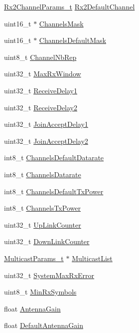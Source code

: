 \begin{DoxyCompactItemize}
\item 
\mbox{\hyperlink{group___l_o_r_a_m_a_c_ga8f57f29481ea92c24f6af04b96a95e0f}{Rx2\+Channel\+Params\+\_\+t}} \mbox{\hyperlink{unionu_mib_param_a0fc23f09c886e3ce57ed0bd2061b336a}{Rx2\+Default\+Channel}}
\item 
uint16\+\_\+t $\ast$ \mbox{\hyperlink{unionu_mib_param_aed7477cfc6166e3ee0499b898443426a}{Channels\+Mask}}
\item 
uint16\+\_\+t $\ast$ \mbox{\hyperlink{unionu_mib_param_ac22764d7ec77150f51f49a3c8839f161}{Channels\+Default\+Mask}}
\item 
uint8\+\_\+t \mbox{\hyperlink{unionu_mib_param_ab2d109f5c6312dc56dfc9842bb6f141b}{Channel\+Nb\+Rep}}
\item 
uint32\+\_\+t \mbox{\hyperlink{unionu_mib_param_ace391217d534408b8f2af268a4ef0945}{Max\+Rx\+Window}}
\item 
uint32\+\_\+t \mbox{\hyperlink{unionu_mib_param_a426f0e1108ebe3ba1b05c2853c0b0c3a}{Receive\+Delay1}}
\item 
uint32\+\_\+t \mbox{\hyperlink{unionu_mib_param_a67fbe3fba2eb31f8879ea22674dd50d8}{Receive\+Delay2}}
\item 
uint32\+\_\+t \mbox{\hyperlink{unionu_mib_param_a59ed32d2c7ce6d0b2011da8b0109b391}{Join\+Accept\+Delay1}}
\item 
uint32\+\_\+t \mbox{\hyperlink{unionu_mib_param_ae4a12f9dc83c6cedcf8afc05fb9ea06f}{Join\+Accept\+Delay2}}
\item 
int8\+\_\+t \mbox{\hyperlink{unionu_mib_param_a69f274bb7ff03f12dbda701c3576ac62}{Channels\+Default\+Datarate}}
\item 
int8\+\_\+t \mbox{\hyperlink{unionu_mib_param_a6c741587260d08d1b883922ce9ca345e}{Channels\+Datarate}}
\item 
int8\+\_\+t \mbox{\hyperlink{unionu_mib_param_af926e909a910970adb9eccc849020c71}{Channels\+Default\+Tx\+Power}}
\item 
int8\+\_\+t \mbox{\hyperlink{unionu_mib_param_ad015aefb498e98276b4102f847b05d0e}{Channels\+Tx\+Power}}
\item 
uint32\+\_\+t \mbox{\hyperlink{unionu_mib_param_ae8c54ca277e4d7295dfd498889e42fdd}{Up\+Link\+Counter}}
\item 
uint32\+\_\+t \mbox{\hyperlink{unionu_mib_param_a7a566925baf83b1b3da9209dfa4bb79a}{Down\+Link\+Counter}}
\item 
\mbox{\hyperlink{group___l_o_r_a_m_a_c_ga02d2523505cac70954c043074087ea65}{Multicast\+Params\+\_\+t}} $\ast$ \mbox{\hyperlink{unionu_mib_param_ab0f9cda74f301d191aa5f7d7090c1557}{Multicast\+List}}
\item 
uint32\+\_\+t \mbox{\hyperlink{unionu_mib_param_a62adc341212fe903e9995966051c5fee}{System\+Max\+Rx\+Error}}
\item 
uint8\+\_\+t \mbox{\hyperlink{unionu_mib_param_ab33f97482f9af163d593cf103a2ccf1c}{Min\+Rx\+Symbols}}
\item 
float \mbox{\hyperlink{unionu_mib_param_a727eaefd87f898a5238118573968962c}{Antenna\+Gain}}
\item 
float \mbox{\hyperlink{unionu_mib_param_a3679fa4ff6ab120429480da6aa8a017d}{Default\+Antenna\+Gain}}
\end{DoxyCompactItemize}


